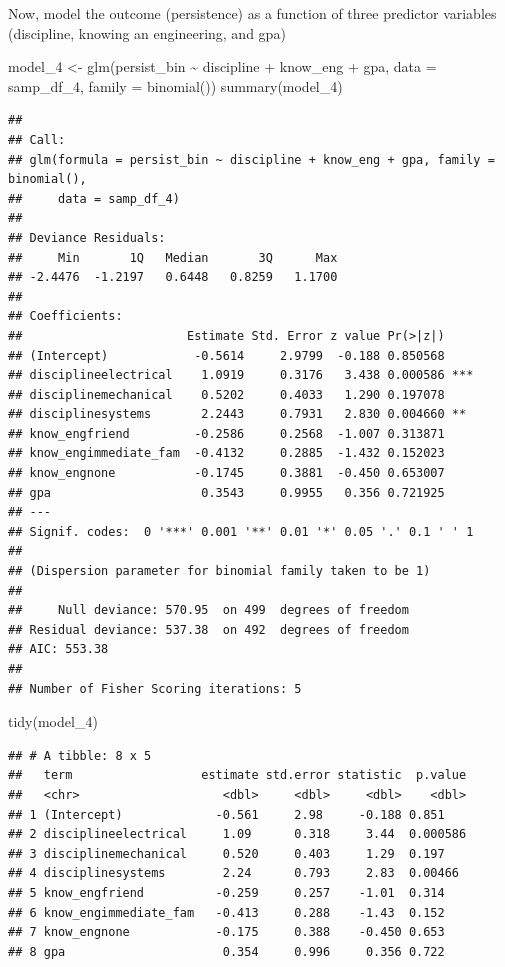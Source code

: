 \documentclass[
]{book}
\newenvironment{Shaded}{\begin{snugshade}}{\end{snugshade}}
\newcommand{\AttributeTok}[1]{\textcolor[rgb]{0.77,0.63,0.00}{#1}}
\newcommand{\FunctionTok}[1]{\textcolor[rgb]{0.00,0.00,0.00}{#1}}
\newcommand{\NormalTok}[1]{#1}
\newcommand{\OtherTok}[1]{\textcolor[rgb]{0.56,0.35,0.01}{#1}}
\newcommand{\SpecialCharTok}[1]{\textcolor[rgb]{0.00,0.00,0.00}{#1}}
\begin{document}
Now, model the outcome (persistence) as a function of three predictor variables (discipline, knowing an engineering, and gpa)

\begin{Shaded}
\begin{Highlighting}[]
\NormalTok{model\_4 }\OtherTok{\textless{}{-}} \FunctionTok{glm}\NormalTok{(persist\_bin }\SpecialCharTok{\textasciitilde{}}\NormalTok{ discipline }\SpecialCharTok{+}\NormalTok{ know\_eng }\SpecialCharTok{+}\NormalTok{ gpa, }\AttributeTok{data =}\NormalTok{ samp\_df\_4, }\AttributeTok{family =} \FunctionTok{binomial}\NormalTok{())}
\FunctionTok{summary}\NormalTok{(model\_4)}
\end{Highlighting}
\end{Shaded}

\begin{verbatim}
## 
## Call:
## glm(formula = persist_bin ~ discipline + know_eng + gpa, family = binomial(), 
##     data = samp_df_4)
## 
## Deviance Residuals: 
##     Min       1Q   Median       3Q      Max  
## -2.4476  -1.2197   0.6448   0.8259   1.1700  
## 
## Coefficients:
##                       Estimate Std. Error z value Pr(>|z|)    
## (Intercept)            -0.5614     2.9799  -0.188 0.850568    
## disciplineelectrical    1.0919     0.3176   3.438 0.000586 ***
## disciplinemechanical    0.5202     0.4033   1.290 0.197078    
## disciplinesystems       2.2443     0.7931   2.830 0.004660 ** 
## know_engfriend         -0.2586     0.2568  -1.007 0.313871    
## know_engimmediate_fam  -0.4132     0.2885  -1.432 0.152023    
## know_engnone           -0.1745     0.3881  -0.450 0.653007    
## gpa                     0.3543     0.9955   0.356 0.721925    
## ---
## Signif. codes:  0 '***' 0.001 '**' 0.01 '*' 0.05 '.' 0.1 ' ' 1
## 
## (Dispersion parameter for binomial family taken to be 1)
## 
##     Null deviance: 570.95  on 499  degrees of freedom
## Residual deviance: 537.38  on 492  degrees of freedom
## AIC: 553.38
## 
## Number of Fisher Scoring iterations: 5
\end{verbatim}

\begin{Shaded}
\begin{Highlighting}[]
\FunctionTok{tidy}\NormalTok{(model\_4)}
\end{Highlighting}
\end{Shaded}

\begin{verbatim}
## # A tibble: 8 x 5
##   term                  estimate std.error statistic  p.value
##   <chr>                    <dbl>     <dbl>     <dbl>    <dbl>
## 1 (Intercept)             -0.561     2.98     -0.188 0.851   
## 2 disciplineelectrical     1.09      0.318     3.44  0.000586
## 3 disciplinemechanical     0.520     0.403     1.29  0.197   
## 4 disciplinesystems        2.24      0.793     2.83  0.00466 
## 5 know_engfriend          -0.259     0.257    -1.01  0.314   
## 6 know_engimmediate_fam   -0.413     0.288    -1.43  0.152   
## 7 know_engnone            -0.175     0.388    -0.450 0.653   
## 8 gpa                      0.354     0.996     0.356 0.722
\end{verbatim}
\end{document}
